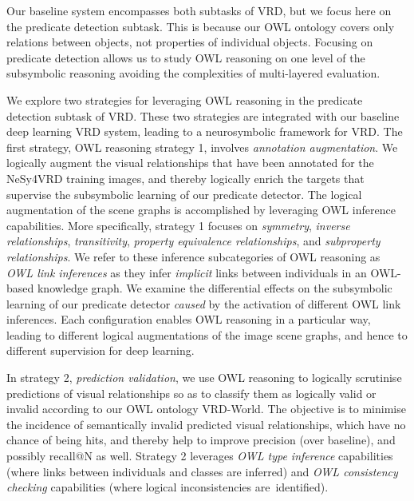 \documentclass[]{jair}
\begin{document}
Our baseline system encompasses both subtasks of VRD, but we focus here on the predicate detection subtask.
This is because our OWL ontology covers only relations between objects, not properties of individual objects.
Focusing on predicate detection allows us to study OWL reasoning on one level of the subsymbolic reasoning avoiding the complexities of multi-layered evaluation.

We explore two strategies for leveraging OWL reasoning in the predicate detection subtask of VRD. These two strategies are integrated with our baseline deep learning VRD system, leading to a neurosymbolic framework for VRD.
The first strategy, OWL reasoning strategy 1, involves \emph{annotation augmentation}.
We logically augment the visual relationships that have been annotated for the NeSy4VRD training images, and thereby logically enrich the targets that supervise the subsymbolic learning of our predicate detector.
The logical augmentation of the scene graphs is accomplished by leveraging OWL inference capabilities.
More specifically, strategy 1 focuses on \textit{symmetry}, \textit{inverse relationships}, \textit{transitivity}, \textit{property equivalence relationships}, and \textit{subproperty relationships}. We refer to these inference subcategories of OWL reasoning as \emph{OWL link inferences} as they infer \emph{implicit} links between individuals in an OWL-based knowledge graph.
We examine the differential effects on the subsymbolic learning of our predicate detector \emph{caused} by the activation of different OWL link inferences.
Each configuration enables OWL reasoning in a particular way, leading to different logical augmentations of the image scene graphs, and hence to different supervision for deep learning.

In strategy 2, \emph{prediction validation}, we use OWL reasoning to logically scrutinise predictions of visual relationships so as to classify them as logically valid or invalid according to our OWL ontology VRD-World.
The objective is to minimise the incidence of semantically invalid predicted visual relationships, which have no chance of being hits, and thereby help to improve precision (over baseline), and possibly recall@N as well.
Strategy 2 leverages \emph{OWL type inference} capabilities (where links between individuals and classes are inferred) and \emph{OWL consistency checking}  capabilities (where logical inconsistencies are~identified).
\end{document}
